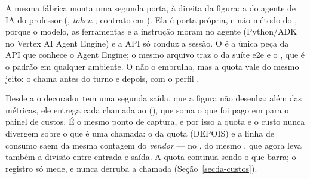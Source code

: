 A mesma fábrica monta uma segunda porta, à direita da figura: a do agente de
IA do professor (, \emph{token}
; contrato em ).
Ela é porta própria, e não método do , porque o modelo, as
ferramentas e a instrução moram no agente (Python/ADK no Vertex AI Agent
Engine) e a API só conduz a sessão. O  é a única peça
da API que conhece o Agent Engine; o mesmo arquivo traz o
 da suíte e2e e o , que é
o padrão em qualquer ambiente. O  não o embrulha, mas a
quota vale do mesmo jeito: o  chama 
antes do turno e  depois, com o perfil .

Desde a  o decorador tem uma segunda saída, que a figura não
desenha: além das métricas, ele entrega cada chamada ao 
(), que soma o que foi pago em
 para o painel de custos. É o mesmo ponto de
captura, e por isso a quota e o custo nunca divergem sobre o que é uma
chamada: o  da quota (DEPOIS) e a linha de consumo saem da mesma
contagem do \emph{vendor} --- no , do mesmo
, que agora leva também a divisão entre entrada e saída. A
quota continua sendo o que barra; o registro só mede, e nunca derruba a
chamada (Seção~\ref{sec:ia-custos}).

